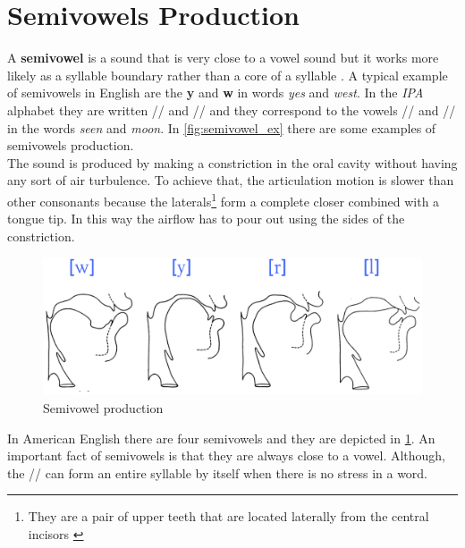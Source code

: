 
\section{Semivowels Production}
\label{sec:Semivowels Production}
A \textbf{semivowel} is a sound that is very close to a vowel sound but it works more likely as a syllable boundary rather than a core of a syllable \cite{ladefoged1998sounds}. A typical example of semivowels in English are the \textbf{y} and \textbf{w} in words \textit{yes} and \textit{west}. In the \textit{IPA} alphabet they are written // and // and they correspond to the vowels // and // in the words \textit{seen} and \textit{moon}. In \ref{fig:semivowel_ex} there are some examples of semivowels production. \\
\noindent The sound is produced by making a constriction in the oral cavity without having any sort of air turbulence. To achieve that, the articulation motion is slower than other consonants because the laterals\footnote{They are a pair of upper teeth that are located laterally from the central incisors \cite{laterals_wiki}} form a complete closer combined with a tongue tip. In this way the airflow has to pour out using the sides of the constriction.

\begin{figure}[!ht]
    \centering
    \includegraphics[scale=0.5]{Figures/semivowel_production.png}
    \caption{Semivowel production \cite{mit_phonetics}}
    \label{fig:semivowel_prod}
\end{figure}

\noindent In American English there are four semivowels and they are depicted in \ref{fig:semivowel_prod}. An important fact of semivowels is that they are always close to a vowel. Although, the // can form an entire syllable by itself when there is no stress in a word.

